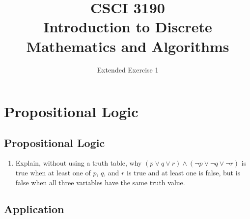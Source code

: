 \documentclass{sig-alternate-05-2015}
\begin{document}






%

\title{CSCI 3190 \\ Introduction to Discrete Mathematics and Algorithms}
\subtitle{Extended Exercise 1}

\maketitle
\begin{abstract}

\end{abstract}

\keywords{}

\section{Propositional Logic}
\subsection{Propositional Logic}

\begin{enumerate}
\item Explain, without using a truth table, why $(p \vee q \vee r) \wedge
(\neg p \vee \neg q \vee \neg r)$ is true when at least one of $p$, $q$, and $r$
is true and at least one is false, but is false when all three
variables have the same truth value.
\end{enumerate}

\subsection{Application}
\end{document}
